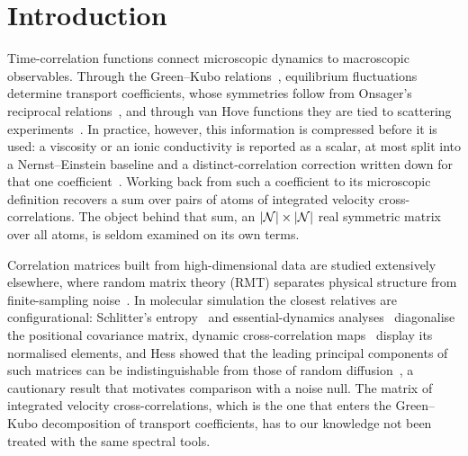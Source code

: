 \section{Introduction}
\label{sec:introduction}

Time-correlation functions connect microscopic dynamics to macroscopic observables.
Through the Green--Kubo relations~\cite{green54a,kubo57a,kubo66a}, equilibrium fluctuations determine transport coefficients, whose symmetries follow from Onsager's reciprocal relations~\cite{onsager31a,onsager31b}, and through van Hove functions they are tied to scattering experiments~\cite{hansen90a}.
In practice, however, this information is compressed before it is used: a viscosity or an ionic conductivity is reported as a scalar, at most split into a Nernst--Einstein baseline and a distinct-correlation correction written down for that one coefficient~\cite{kashyap11a,fong20a,fong21a}.
Working back from such a coefficient to its microscopic definition recovers a sum over pairs of atoms of integrated velocity cross-correlations.
The object behind that sum, an $|\mathcal{N}| \times |\mathcal{N}|$ real symmetric matrix over all atoms, is seldom examined on its own terms.

Correlation matrices built from high-dimensional data are studied extensively elsewhere, where random matrix theory (RMT) separates physical structure from finite-sampling noise~\cite{plerou1999,laloux1999,bouchaud2011}.
In molecular simulation the closest relatives are configurational: Schlitter's entropy~\cite{schlitter1993,andricioaei2001} and essential-dynamics analyses~\cite{amadei1993} diagonalise the positional covariance matrix, dynamic cross-correlation maps~\cite{ichiye1991} display its normalised elements, and Hess showed that the leading principal components of such matrices can be indistinguishable from those of random diffusion~\cite{hess2000,hess2002}, a cautionary result that motivates comparison with a noise null.
The matrix of integrated velocity cross-correlations, which is the one that enters the Green--Kubo decomposition of transport coefficients, has to our knowledge not been treated with the same spectral tools.

